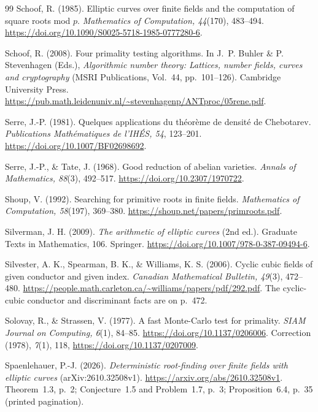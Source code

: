 \documentclass[11pt]{article}
\theoremstyle{definition}
\theoremstyle{remark}
\begin{document}
\begin{thebibliography}{99}
Schoof, R. (1985).
Elliptic curves over finite fields and the computation of square roots mod $p$.
\emph{Mathematics of Computation, 44}(170), 483--494.
\url{https://doi.org/10.1090/S0025-5718-1985-0777280-6}.

Schoof, R. (2008). Four primality testing algorithms.
In J.~P. Buhler \& P. Stevenhagen (Eds.),
\emph{Algorithmic number theory: Lattices, number fields, curves and cryptography}
(MSRI Publications, Vol.~44, pp.~101--126). Cambridge University Press.
\url{https://pub.math.leidenuniv.nl/~stevenhagenp/ANTproc/05rene.pdf}.

Serre, J.-P. (1981).
Quelques applications du th\'eor\`eme de densit\'e de Chebotarev.
\emph{Publications Math\'ematiques de l'IH\'ES, 54}, 123--201.
\url{https://doi.org/10.1007/BF02698692}.

Serre, J.-P., \& Tate, J. (1968). Good reduction of abelian varieties.
\emph{Annals of Mathematics, 88}(3), 492--517.
\url{https://doi.org/10.2307/1970722}.

Shoup, V. (1992). Searching for primitive roots in finite fields.
\emph{Mathematics of Computation, 58}(197), 369--380.
\url{https://shoup.net/papers/primroots.pdf}.

Silverman, J. H. (2009).
\emph{The arithmetic of elliptic curves} (2nd ed.).
Graduate Texts in Mathematics, 106. Springer.
\url{https://doi.org/10.1007/978-0-387-09494-6}.

Silvester, A. K., Spearman, B. K., \& Williams, K. S. (2006).
Cyclic cubic fields of given conductor and given index.
\emph{Canadian Mathematical Bulletin, 49}(3), 472--480.
\url{https://people.math.carleton.ca/~williams/papers/pdf/292.pdf}.
The cyclic-cubic conductor and discriminant facts are on p.~472.

Solovay, R., \& Strassen, V. (1977). A fast Monte-Carlo test for primality.
\emph{SIAM Journal on Computing, 6}(1), 84--85.
\url{https://doi.org/10.1137/0206006}.
Correction (1978), \emph{7}(1), 118,
\url{https://doi.org/10.1137/0207009}.

Spaenlehauer, P.-J. (2026).
\emph{Deterministic root-finding over finite fields with elliptic curves}
(arXiv:2610.32508v1).
\url{https://arxiv.org/abs/2610.32508v1}.
Theorem~1.3, p.~2; Conjecture~1.5 and Problem~1.7, p.~3;
Proposition~6.4, p.~35 (printed pagination).


\end{thebibliography}
\end{document}
